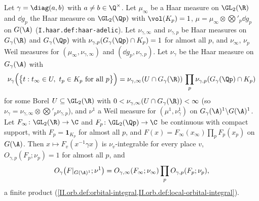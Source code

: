 Let $\gamma=\diag(a,b)$ with $a\neq b\in\Q^\times$. Let $\mu_\infty$ be a Haar measure on $\GL_2(\R)$ and $\dd g_p$ the Haar measure on $\GL_2(\Qp)$ with $\vol(K_p)=1$,
$\mu=\mu_\infty\otimes\bigotimes'_p\dd g_p$ on $G(\A)$ (\texttt{I.haar.def:haar-adelic}). Let $\nu_{\gamma,\infty}$ and $\nu_{\gamma,p}$ be Haar measures on $G_\gamma(\R)$ and
$G_\gamma(\Qp)$ with $\nu_{\gamma,p}(G_\gamma(\Qp)\cap K_p)=1$ for almost all $p$, and $\nu_\infty$, $\nu_p$ Weil measures for $(\mu_\infty,\nu_{\gamma,\infty})$ and $(\dd g_p,\nu_{\gamma,p})$.
Let $\nu_\gamma$ be the Haar measure on $G_\gamma(\A)$ with
\[
  \nu_\gamma\Bigl(\bigl\{t:t_\infty\in U,\ t_p\in K_p\text{ for all }p\bigr\}\Bigr)=\nu_{\gamma,\infty}(U\cap G_\gamma(\R))\,\prod_p\nu_{\gamma,p}(G_\gamma(\Qp)\cap K_p)
\]
for some Borel $U\subseteq\GL_2(\R)$ with $0<\nu_{\gamma,\infty}(U\cap G_\gamma(\R))<\infty$ (so $\nu_\gamma=\nu_{\gamma,\infty}\otimes\bigotimes'_p\nu_{\gamma,p}$), and $\nu^1$ a Weil measure
for $(\mu^1,\nu_\gamma^1)$ on $G_\gamma(\A)^1\backslash G(\A)^1$. Let $F_\infty\colon\GL_2(\R)\to\C$ and $F_p\colon\GL_2(\Qp)\to\C$ be continuous with compact support, with
$F_p=\mathbf 1_{K_p}$ for almost all $p$, and $F(x)=F_\infty(x_\infty)\prod_pF_p(x_p)$ on $G(\A)$. Then $x\mapsto F_v(x^{-1}\gamma x)$ is $\nu_v$-integrable for every place $v$,
$O_{\gamma,p}(F_p;\nu_p)=1$ for almost all $p$, and
\[
  O_\gamma\bigl(F|_{G(\A)^1};\nu^1\bigr)=O_{\gamma,\infty}(F_\infty;\nu_\infty)\prod_pO_{\gamma,p}(F_p;\nu_p),
\]
a finite product (\cref{II.orb.def:orbital-integral,II.orb.def:local-orbital-integral}).
